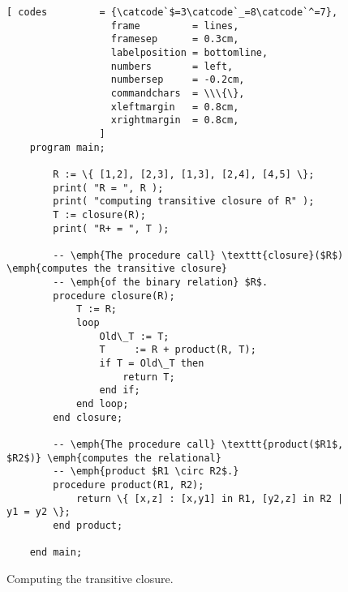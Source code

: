 \begin{figure}[!ht]
  \centering
\begin{Verbatim}[ codes         = {\catcode`$=3\catcode`_=8\catcode`^=7},
                  frame         = lines, 
                  framesep      = 0.3cm, 
                  labelposition = bottomline,
                  numbers       = left,
                  numbersep     = -0.2cm,
                  commandchars  = \\\{\},
                  xleftmargin   = 0.8cm,
                  xrightmargin  = 0.8cm,
                ]
    program main;
    
        R := \{ [1,2], [2,3], [1,3], [2,4], [4,5] \};
        print( "R = ", R );
        print( "computing transitive closure of R" );
        T := closure(R);
        print( "R+ = ", T );
    
        -- \emph{The procedure call} \texttt{closure}($R$) \emph{computes the transitive closure}
        -- \emph{of the binary relation} $R$.
        procedure closure(R);
            T := R;
            loop
                Old\_T := T;
                T     := R + product(R, T);
                if T = Old\_T then
                    return T;
                end if;
            end loop;
        end closure;

        -- \emph{The procedure call} \texttt{product($R1$, $R2$)} \emph{computes the relational}
        -- \emph{product $R1 \circ R2$.}
        procedure product(R1, R2);
            return \{ [x,z] : [x,y1] in R1, [y2,z] in R2 | y1 = y2 \};
        end product;
    
    end main;
\end{Verbatim} 
\vspace*{-0.3cm}
\caption{Computing the transitive closure.}  \label{fig:transitive.stl}
\end{figure} %

